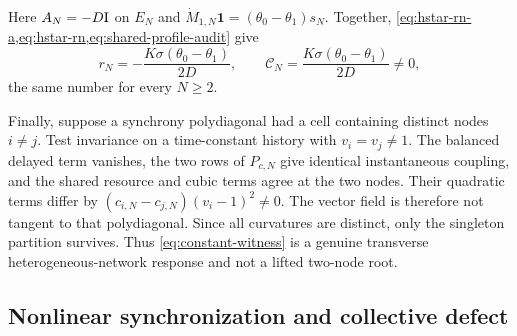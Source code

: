 Here \(A_N=-D\mathrm I\) on \(E_N\) and
\(\dot M_{1,N}\mathbf1=(\theta_0-\theta_1)s_N\).
Together, \cref{eq:hstar-rn-a,eq:hstar-rn,eq:shared-profile-audit} give
\begin{equation}
 r_N=-\frac{K\sigma(\theta_0-\theta_1)}{2D},
 \qquad
 \mathscr C_N=\frac{K\sigma(\theta_0-\theta_1)}{2D}\ne0,
                                                               \label{eq:constant-witness}
\end{equation}
the same number for every \(N\ge2\).

Finally, suppose a synchrony polydiagonal had a cell containing distinct
nodes \(i\ne j\).  Test invariance on a time-constant history with
\(v_i=v_j\ne1\).  The balanced delayed term vanishes, the two rows of
\(P_{c,N}\) give identical instantaneous coupling, and the shared resource
and cubic terms agree at the two nodes.  Their quadratic terms differ by
\((c_{i,N}-c_{j,N})(v_i-1)^2\ne0\).  The vector field is therefore not
tangent to that polydiagonal.  Since all curvatures are distinct, only the
singleton partition survives.  Thus \cref{eq:constant-witness} is a genuine
transverse heterogeneous-network response and not a lifted two-node root.

\subsection{Nonlinear synchronization and collective defect}

